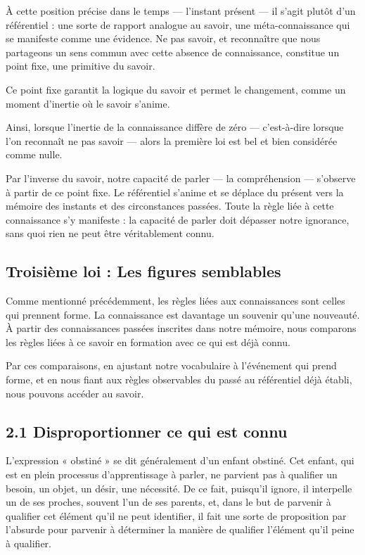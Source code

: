 \documentclass[12pt,oneside]{article}
\begin{document}
À cette position précise dans le temps --- l'instant présent --- il s'agit plutôt d'un référentiel : une sorte de rapport analogue au savoir, une méta-connaissance qui se manifeste comme une évidence. Ne pas savoir, et reconnaître que nous partageons un sens commun avec cette absence de connaissance, constitue un point fixe, une primitive du savoir.

Ce point fixe garantit la logique du savoir et permet le changement, comme un moment d'inertie où le savoir s'anime.

Ainsi, lorsque l'inertie de la connaissance diffère de zéro --- c'est-à-dire lorsque l'on reconnaît ne pas savoir --- alors la première loi est bel et bien considérée comme nulle.

Par l'inverse du savoir, notre capacité de parler --- la compréhension --- s'observe à partir de ce point fixe. Le référentiel s'anime et se déplace du présent vers la mémoire des instants et des circonstances passées. Toute la règle liée à cette connaissance s'y manifeste : la capacité de parler doit dépasser notre ignorance, sans quoi rien ne peut être véritablement connu.

\subsection{Troisième loi : Les figures semblables}

Comme mentionné précédemment, les règles liées aux connaissances sont celles qui prennent forme. La connaissance est davantage un souvenir qu'une nouveauté. À partir des connaissances passées inscrites dans notre mémoire, nous comparons les règles liées à ce savoir en formation avec ce qui est déjà connu.

Par ces comparaisons, en ajustant notre vocabulaire à l'événement qui prend forme, et en nous fiant aux règles observables du passé au référentiel déjà établi, nous pouvons accéder au savoir.

\subsection{2.1 Disproportionner ce qui est connu}

L'expression « obstiné » se dit généralement d'un enfant obstiné. Cet enfant, qui est en plein processus d'apprentissage à parler, ne parvient pas à qualifier un besoin, un objet, un désir, une nécessité. De ce fait, puisqu'il ignore, il interpelle un de ses proches, souvent l'un de ses parents, et, dans le but de parvenir à qualifier cet élément qu'il ne peut identifier, il fait une sorte de proposition par l'absurde pour parvenir à déterminer la manière de qualifier l'élément qu'il peine à qualifier.
\end{document}
